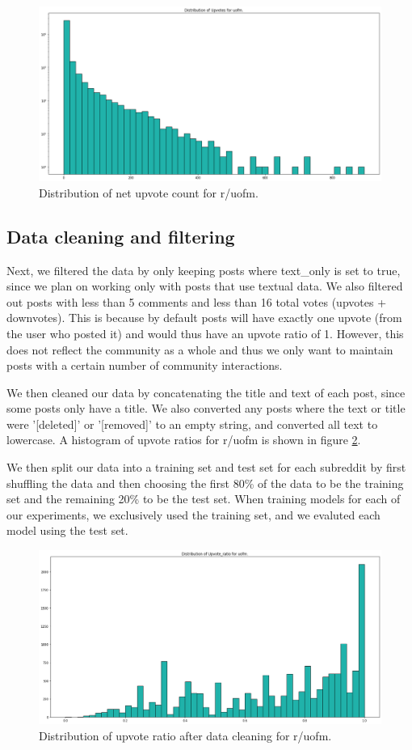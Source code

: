 \documentclass[11pt,a4paper]{article}
\let\Oldsubsection\subsection
\renewcommand{\subsection}{\FloatBarrier\Oldsubsection}
\begin{document}
    \begin{figure}
        \includegraphics[width=\textwidth]{uofm_upvotes.png}
        \caption{Distribution of net upvote count for r/uofm.}
        \label{fig:uofm_upvotes}
    \end{figure}

    \Oldsubsection{Data cleaning and filtering}
    Next, we filtered the data by only keeping posts where text\_only is set to true, since we plan on working only with posts that use textual data. We also filtered out posts with less than 5 comments and less than 16 total votes (upvotes + downvotes). This is because by default posts will have exactly one upvote (from the user who posted it) and would thus have an upvote ratio of 1. However, this does not reflect the community as a whole and thus we only want to maintain posts with a certain number of community interactions.

    We then cleaned our data by concatenating the title and text of each post, since some posts only have a title. We also converted any posts where the text or title were '[deleted]' or '[removed]' to an empty string, and converted all text to lowercase. A histogram of upvote ratios for r/uofm is shown in figure \ref{fig:uofm_ratio1}.

    We then split our data into a training set and test set for each subreddit by first shuffling the data and then choosing the first 80\% of the data to be the training set and the remaining 20\% to be the test set. When training models for each of our experiments, we exclusively used the training set, and we evaluted each model using the test set.

    \begin{figure}
        \includegraphics[width=\textwidth]{uofm_ratio1.png}
        \caption{Distribution of upvote ratio after data cleaning for r/uofm.}
        \label{fig:uofm_ratio1}
    \end{figure}
\end{document}
